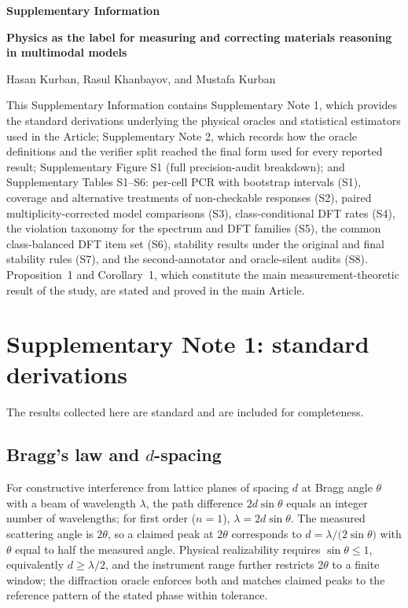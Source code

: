 \documentclass[11pt,a4paper]{article}
\begin{document}
\begin{center}
{\Large\bfseries Supplementary Information\par}

\vspace{0.7em}

{\large\bfseries
Physics as the label for measuring and correcting materials reasoning in multimodal models
\par}

\vspace{0.8em}

{\normalsize
Hasan Kurban, Rasul Khanbayov, and Mustafa Kurban
\par}
\end{center}

\vspace{1.0em}

\noindent
This Supplementary Information contains Supplementary Note 1, which provides
the standard derivations underlying the physical oracles and statistical
estimators used in the Article; Supplementary Note 2, which records how the oracle
definitions and the verifier split reached the final form used for every reported result;
Supplementary Figure S1 (full precision-audit breakdown); and Supplementary Tables S1--S6: per-cell
PCR with bootstrap intervals (S1), coverage and alternative treatments of non-checkable responses
(S2), paired multiplicity-corrected model comparisons (S3), class-conditional DFT rates (S4), the
violation taxonomy for the spectrum and DFT families (S5), the common class-balanced DFT item
set (S6), stability results under the original and final stability rules (S7), and the second-annotator and
oracle-silent audits (S8). Proposition~1 and Corollary~1, which constitute the main
measurement-theoretic result of the study, are stated and proved in the main
Article.

\vspace{0.5em}

\section*{Supplementary Note 1: standard derivations}
\noindent The results collected here are standard and are included for completeness.
\setcounter{subsection}{0}
\renewcommand{\thesubsection}{1.\arabic{subsection}}

\subsection{Bragg's law and \texorpdfstring{$d$}{d}-spacing}
For constructive interference from lattice planes of spacing $d$ at Bragg angle
$\theta$ with a beam of wavelength $\lambda$, the path difference $2d\sin\theta$ equals an
integer number of wavelengths; for first order ($n=1$), $\lambda=2d\sin\theta$. The
measured scattering angle is $2\theta$, so a claimed peak at $2\theta$ corresponds to
$d=\lambda/\!\big(2\sin\theta\big)$ with $\theta$ equal to half the measured angle.
Physical realizability requires $\sin\theta\le1$, equivalently $d\ge\lambda/2$, and the
instrument range further restricts $2\theta$ to a finite window; the diffraction oracle
enforces both and matches claimed peaks to the reference pattern of the stated phase
within tolerance.
\end{document}
